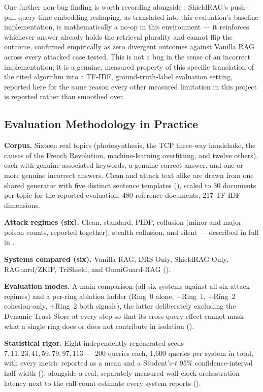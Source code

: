 One further non-bug finding is worth recording alongside
: ShieldRAG's push--pull query-time embedding
reshaping, as translated into this evaluation's baseline
implementation, is mathematically a no-op in this environment --- it
reinforces whichever answer already holds the retrieval plurality and
cannot flip the outcome, confirmed empirically as zero divergent
outcomes against Vanilla RAG across every attacked case tested. This is
not a bug in the sense of an incorrect implementation; it is a genuine,
measured property of this specific translation of the cited algorithm
into a TF-IDF, ground-truth-label evaluation setting, reported here for
the same reason every other measured limitation in this project is
reported rather than smoothed over.

\subsection{Evaluation Methodology in Practice}
\label{sec:eval-practice}

\textbf{Corpus.} Sixteen real topics (photosynthesis, the TCP three-way
handshake, the causes of the French Revolution, machine-learning
overfitting, and twelve others), each with genuine associated keywords, a
genuine correct answer, and one or more genuine incorrect answers.
Clean and attack text alike are drawn from one shared generator with five
distinct sentence templates (), scaled to 30
documents per topic for the reported evaluation: 480 reference documents,
217 TF-IDF dimensions.

\textbf{Attack regimes (six).} Clean, standard, PIDP, collusion (minor
and major poison counts, reported together), stealth collusion, and
silent --- described in full in .

\textbf{Systems compared (six).} Vanilla RAG, DRS Only, ShieldRAG Only,
RAGuard/ZKIP, TriShield, and OmniGuard-RAG ().

\textbf{Evaluation modes.} A main comparison (all six systems against all
six attack regimes) and a per-ring ablation ladder (Ring~0 alone,
$+$Ring~1, $+$Ring~2 cohesion-only, $+$Ring~2 both signals), the latter
deliberately excluding the Dynamic Trust Store at every step so that its
cross-query effect cannot mask what a single ring does or does not
contribute in isolation ().

\textbf{Statistical rigor.} Eight independently regenerated seeds ---
$7, 11, 23, 41, 59, 79, 97, 113$ --- 200 queries each, 1{,}600 queries per
system in total, with every metric reported as a mean and a Student's-$t$
95\% confidence-interval half-width (), alongside a
real, separately measured wall-clock orchestration latency next to the
call-count estimate every system reports ().
